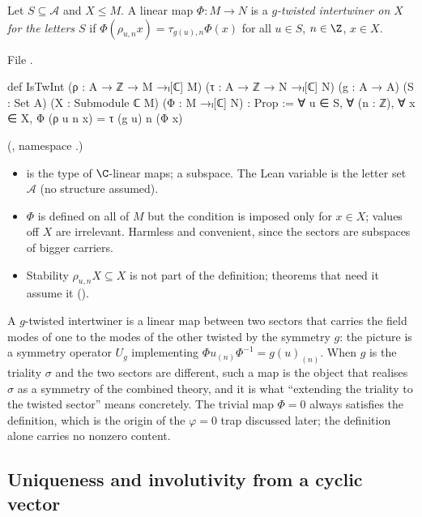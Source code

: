 \begin{definition}\label{ch12:def:istwint}
Let $S\subseteq\mathcal A$ and $X\le M$.  A linear map $\Phi:M\to N$ is a \emph{$g$-twisted intertwiner
on $X$ for the letters $S$} if $\Phi(\rho_{u,n}x)=\tau_{g(u),n}\Phi(x)$ for all $u\in S$, $n\in\Z$,
$x\in X$.
\end{definition}
File .
\begin{leancode}
def IsTwInt (ρ : A → ℤ → M →ₗ[ℂ] M) (τ : A → ℤ → N →ₗ[ℂ] N) (g : A → A) (S : Set A)
    (X : Submodule ℂ M) (Φ : M →ₗ[ℂ] N) : Prop :=
  ∀ u ∈ S, ∀ (n : ℤ), ∀ x ∈ X, Φ (ρ u n x) = τ (g u) n (Φ x)
\end{leancode}
(, namespace .)
\begin{dictionary}
\begin{itemize}
\item {} is the type of $\C$-linear maps;  a subspace.  The Lean
  variable  is the letter set $\mathcal A$ (no structure assumed).
\item $\Phi$ is defined on all of $M$ but the condition is imposed only for $x\in X$; values off $X$ are
  irrelevant.  Harmless and convenient, since the sectors are subspaces of bigger carriers.
\item Stability $\rho_{u,n}X\subseteq X$ is not part of the definition; theorems that need it assume it
  ().
\end{itemize}
\end{dictionary}

\begin{physics}
A $g$-twisted intertwiner is a linear map between two sectors that carries the field modes of one to the modes of the other twisted by the symmetry $g$: the picture is a symmetry operator $U_g$ implementing $\Phi u_{(n)}\Phi^{-1}=g(u)_{(n)}$. When $g$ is the triality $\sigma$ and the two sectors are different, such a map is the object that realises $\sigma$ as a symmetry of the combined theory, and it is what ``extending the triality to the twisted sector'' means concretely. The trivial map $\Phi=0$ always satisfies the definition, which is the origin of the $\varphi=0$ trap discussed later; the definition alone carries no nonzero content.
\end{physics}

\subsection{Uniqueness and involutivity from a cyclic vector}

